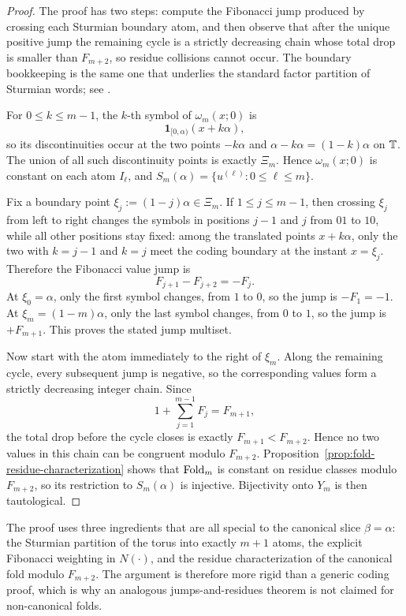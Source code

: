\begin{proof}
The proof has two steps: compute the Fibonacci jump produced by crossing each
Sturmian boundary atom, and then observe that after the unique positive jump
the remaining cycle is a strictly decreasing chain whose total drop is smaller
than \(F_{m+2}\), so residue collisions cannot occur. The boundary bookkeeping
is the same one that underlies the standard factor partition of Sturmian words;
see \cite{LindMarcus1995,Fogg2002,Berthe2001Ostrowski}.

For \(0\le k\le m-1\), the \(k\)-th symbol of \(\omega_m(x;0)\) is
\[
\mathbf{1}_{[0,\alpha)}(x+k\alpha),
\]
so its discontinuities occur at the two points \(-k\alpha\) and
\(\alpha-k\alpha=(1-k)\alpha\) on \(\mathbb{T}\). The union of all such discontinuity
points is exactly \(\Xi_m\). Hence \(\omega_m(x;0)\) is constant on each atom
\(I_\ell\), and \(S_m(\alpha)=\{u^{(\ell)}:0\le \ell\le m\}\).

Fix a boundary point \(\xi_j:=(1-j)\alpha\in\Xi_m\).
If \(1\le j\le m-1\), then crossing \(\xi_j\) from left to right changes the
symbols in positions \(j-1\) and \(j\) from \(01\) to \(10\), while all other
positions stay fixed: among the translated points \(x+k\alpha\), only the two
with \(k=j-1\) and \(k=j\) meet the coding boundary at the instant \(x=\xi_j\).
Therefore the Fibonacci value jump is
\[
F_{j+1}-F_{j+2}=-F_j.
\]
At \(\xi_0=\alpha\), only the first symbol changes, from \(1\) to \(0\), so
the jump is \(-F_1=-1\). At \(\xi_m=(1-m)\alpha\), only the last symbol
changes, from \(0\) to \(1\), so the jump is \(+F_{m+1}\). This proves the
stated jump multiset.

Now start with the atom immediately to the right of \(\xi_m\). Along the
remaining cycle, every subsequent jump is negative, so the corresponding values
form a strictly decreasing integer chain. Since
\[
1+\sum_{j=1}^{m-1}F_j=F_{m+1},
\]
the total drop before the cycle closes is exactly \(F_{m+1}<F_{m+2}\). Hence
no two values in this chain can be congruent modulo \(F_{m+2}\).
Proposition~\ref{prop:fold-residue-characterization} shows that
\(\mathrm{Fold}_m\) is constant on residue classes modulo \(F_{m+2}\), so its
restriction to \(S_m(\alpha)\) is injective. Bijectivity onto \(Y_m\) is then
tautological.
\end{proof}

\begin{remark}
\label{rem:sturmian-rigidity-special}
The proof uses three ingredients that are all special to the canonical slice
\(\beta=\alpha\): the Sturmian partition of the torus into exactly \(m+1\)
atoms, the explicit Fibonacci weighting in \(N(\cdot)\), and the residue
characterization of the canonical fold modulo \(F_{m+2}\). The argument is
therefore more rigid than a generic coding proof, which is why an analogous
jumps-and-residues theorem is not claimed for non-canonical folds.
\end{remark}

